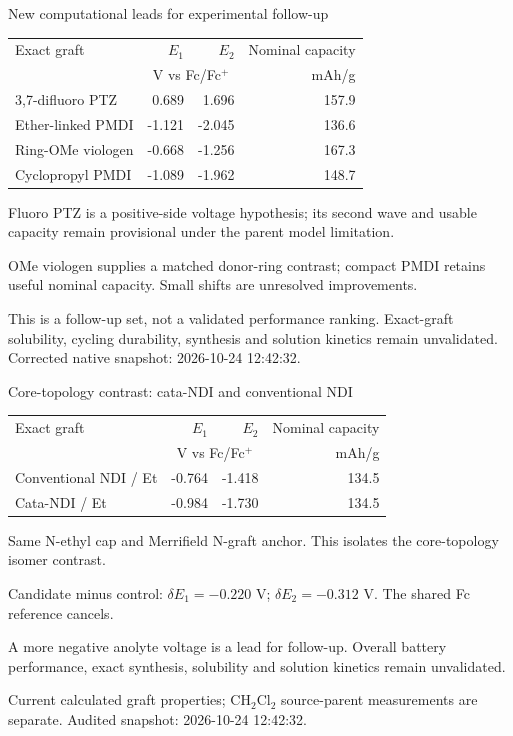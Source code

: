\begin{frame}{New computational leads for experimental follow-up}
\small\centering\renewcommand{\arraystretch}{1.25}
\begin{tabular}{@{}lrrr@{}}\toprule
Exact graft & $E_1$ & $E_2$ & Nominal capacity \\
& \multicolumn{2}{c}{V vs Fc/Fc$^+$} & mAh/g \\ \midrule
3,7-difluoro PTZ & 0.689 & 1.696 & 157.9 \\
Ether-linked PMDI & -1.121 & -2.045 & 136.6 \\
Ring-OMe viologen & -0.668 & -1.256 & 167.3 \\
Cyclopropyl PMDI & -1.089 & -1.962 & 148.7 \\
\bottomrule\end{tabular}\par\vspace{1ex}\raggedright
\footnotesize Fluoro PTZ is a positive-side voltage hypothesis; its second wave and usable capacity remain provisional under the parent model limitation.
\par\vspace{1ex}OMe viologen supplies a matched donor-ring contrast; compact PMDI retains useful nominal capacity. Small shifts are unresolved improvements.
\par\vspace{1ex}This is a follow-up set, not a validated performance ranking. Exact-graft solubility, cycling durability, synthesis and solution kinetics remain unvalidated.
\vfill\scriptsize Corrected native snapshot: 2026-10-24 12:42:32.
\end{frame}
\begin{frame}{Core-topology contrast: cata-NDI and conventional NDI}
\small\centering\renewcommand{\arraystretch}{1.25}
\begin{tabular}{@{}lrrr@{}}\toprule
Exact graft & $E_1$ & $E_2$ & Nominal capacity \\
& \multicolumn{2}{c}{V vs Fc/Fc$^+$} & mAh/g \\ \midrule
Conventional NDI / Et & -0.764 & -1.418 & 134.5 \\
Cata-NDI / Et & -0.984 & -1.730 & 134.5 \\
\bottomrule\end{tabular}\par\vspace{1.5ex}\raggedright
\footnotesize Same N-ethyl cap and Merrifield N-graft anchor. This isolates the core-topology isomer contrast.
\par\vspace{1ex}Candidate minus control: $\delta E_1=-0.220$ V; $\delta E_2=-0.312$ V. The shared Fc reference cancels.
\par\vspace{1ex}A more negative anolyte voltage is a lead for follow-up. Overall battery performance, exact synthesis, solubility and solution kinetics remain unvalidated.
\par\vspace{1ex}\scriptsize Current calculated graft properties; CH$_2$Cl$_2$ source-parent measurements are separate.
\vfill\scriptsize Audited snapshot: 2026-10-24 12:42:32.
\end{frame}
